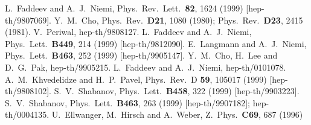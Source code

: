 \documentclass[a4paper,12pt]{article}
\begin{document}
\begin{thebibliography}{99}

L.~Faddeev and A.~J.~Niemi,
Phys.\ Rev.\ Lett.\  {\bf 82}, 1624 (1999)
[hep-th/9807069].
%
Y.~M.~Cho,
Phys.\ Rev.\  {\bf D21}, 1080 (1980);
Phys.\ Rev.\  {\bf D23}, 2415 (1981).
%  
V.~Periwal,
hep-th/9808127.
%
L.~Faddeev and A.~J.~Niemi,
Phys.\ Lett.\  {\bf B449}, 214 (1999)
[hep-th/9812090].
%
E.~Langmann and A.~J.~Niemi,
Phys.\ Lett.\  {\bf B463}, 252 (1999)
[hep-th/9905147].
%
Y.~M.~Cho, H.~Lee and D.~G.~Pak,
hep-th/9905215.
%
L.~Faddeev and A.~J.~Niemi,
hep-th/0101078.
%
A.~M.~Khvedelidze and H.~P.~Pavel,
Phys.\ Rev.\ D {\bf 59}, 105017 (1999)
[hep-th/9808102].
%
S.~V.~Shabanov,
Phys.\ Lett.\  {\bf B458}, 322 (1999)
[hep-th/9903223].
S.~V.~Shabanov,
Phys.\ Lett.\  {\bf B463}, 263 (1999)
[hep-th/9907182];
hep-th/0004135.
%
U.~Ellwanger, M.~Hirsch and A.~Weber,
Z.\ Phys.\  {\bf C69}, 687 (1996)

\end{thebibliography}
\end{document}
